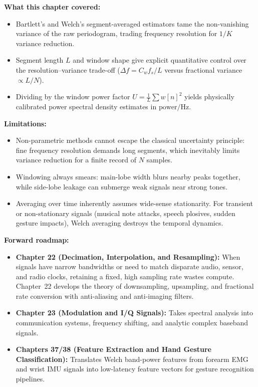 \begin{recoverybox}
\textbf{What this chapter covered:}
\begin{itemize}
  \item Bartlett's and Welch's segment-averaged estimators tame the non-vanishing variance of the raw periodogram, trading frequency resolution for $1/K$ variance reduction.
  \item Segment length $L$ and window shape give explicit quantitative control over the resolution--variance trade-off ($\Delta f = C_w f_s/L$ versus fractional variance $\propto L/N$).
  \item Dividing by the window power factor $U = \frac{1}{L}\sum w[n]^2$ yields physically calibrated power spectral density estimates in $\text{power}/\text{Hz}$.
\end{itemize}

\textbf{Limitations:}
\begin{itemize}
  \item Non-parametric methods cannot escape the classical uncertainty principle: fine frequency resolution demands long segments, which inevitably limits variance reduction for a finite record of $N$ samples.
  \item Windowing always smears: main-lobe width blurs nearby peaks together, while side-lobe leakage can submerge weak signals near strong tones.
  \item Averaging over time inherently assumes wide-sense stationarity. For transient or non-stationary signals (musical note attacks, speech plosives, sudden gesture impacts), Welch averaging destroys the temporal dynamics.
\end{itemize}

\textbf{Forward roadmap:}
\begin{itemize}
  \item \textbf{Chapter 22 (Decimation, Interpolation, and Resampling):} When signals have narrow bandwidths or need to match disparate audio, sensor, and radio clocks, retaining a fixed, high sampling rate wastes compute. Chapter~22 develops the theory of downsampling, upsampling, and fractional rate conversion with anti-aliasing and anti-imaging filters.
  \item \textbf{Chapter 23 (Modulation and I/Q Signals):} Takes spectral analysis into communication systems, frequency shifting, and analytic complex baseband signals.
  \item \textbf{Chapters 37/38 (Feature Extraction and Hand Gesture Classification):} Translates Welch band-power features from forearm EMG and wrist IMU signals into low-latency feature vectors for gesture recognition pipelines.
\end{itemize}
\end{recoverybox}

